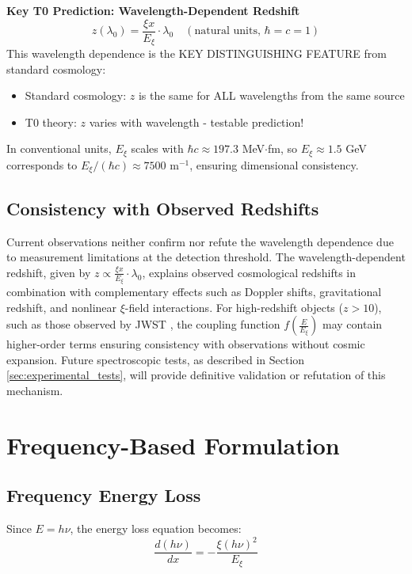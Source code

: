 \documentclass[12pt,a4paper]{article}
\newcommand{\Exi}{E_\xi}
\newcommand{\lambdazero}{\lambda_0}
\theoremstyle{definition}
\begin{document}
	\begin{important}
		\textbf{Key T0 Prediction: Wavelength-Dependent Redshift}
		\begin{equation}
			\boxed{z(\lambdazero) = \frac{\xi x}{\Exi} \cdot \lambdazero \quad (\text{natural units, } \hbar = c = 1)}
		\end{equation}
		This wavelength dependence is the KEY DISTINGUISHING FEATURE from standard cosmology:
		\begin{itemize}
			\item Standard cosmology: $z$ is the same for ALL wavelengths from the same source
			\item T0 theory: $z$ varies with wavelength - testable prediction!
		\end{itemize}
		In conventional units, $\Exi$ scales with $\hbar c \approx 197.3$ MeV$\cdot$fm, so $\Exi \approx 1.5$ GeV corresponds to $\Exi / (\hbar c) \approx 7500$ m$^{-1}$, ensuring dimensional consistency.
	\end{important}
	
	\subsection{Consistency with Observed Redshifts}
	Current observations neither confirm nor refute the wavelength dependence due to measurement limitations at the detection threshold. The wavelength-dependent redshift, given by $z \propto \frac{\xi x}{\Exi} \cdot \lambdazero$, explains observed cosmological redshifts in combination with complementary effects such as Doppler shifts, gravitational redshift, and nonlinear $\xi$-field interactions. For high-redshift objects ($z > 10$), such as those observed by JWST \cite{jwst_early}, the coupling function $f\left(\frac{E}{\Exi}\right)$ may contain higher-order terms ensuring consistency with observations without cosmic expansion. Future spectroscopic tests, as described in Section \ref{sec:experimental_tests}, will provide definitive validation or refutation of this mechanism.
	
	\section{Frequency-Based Formulation}
	
	\subsection{Frequency Energy Loss}
	
	Since $E = h\nu$, the energy loss equation becomes:
	\begin{equation}
		\frac{d(h\nu)}{dx} = -\frac{\xi (h\nu)^2}{\Exi}
	\end{equation}
	
\end{document}
